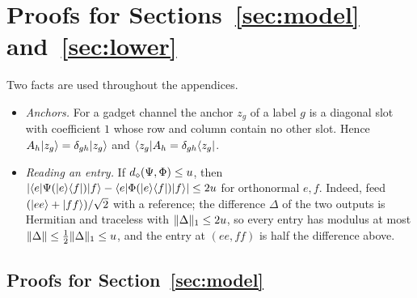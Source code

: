 \section{Proofs for Sections~\ref{sec:model} and~\ref{sec:lower}}\label{app:lower}

Two facts are used throughout the appendices.

\begin{itemize}[leftmargin=2.8em]
\item[(F1)] \emph{Anchors.} For a gadget channel the anchor $z_g$ of a label $g$ is a diagonal slot with coefficient $1$ whose row and column contain
no other slot. Hence $A_h\lvert z_g\rangle=\delta_{gh}\lvert z_g\rangle$ and $\langle z_g\rvert A_h=\delta_{gh}\langle z_g\rvert$.
\item[(F2)] \emph{Reading an entry.} If $d_\diamond(\Psi,\Phi)\le u$, then $|\langle e\rvert\Psi(\lvert e\rangle\langle f\rvert)\lvert f\rangle-\langle e\rvert\Phi(\lvert e\rangle\langle f\rvert)\lvert f\rangle|\le2u$ for orthonormal $e,f$.
Indeed, feed $(\lvert ee\rangle+\lvert ff\rangle)/\sqrt2$ with a reference; the difference $\Delta$ of the two outputs is Hermitian and traceless with $\lVert \Delta\rVert_1\le2u$,
so every entry has modulus at most $\lVert \Delta\rVert\le\frac12\lVert \Delta\rVert_1\le u$, and the entry at $(ee,ff)$ is half the difference above.
\end{itemize}

\subsection{Proofs for Section~\ref{sec:model}}


